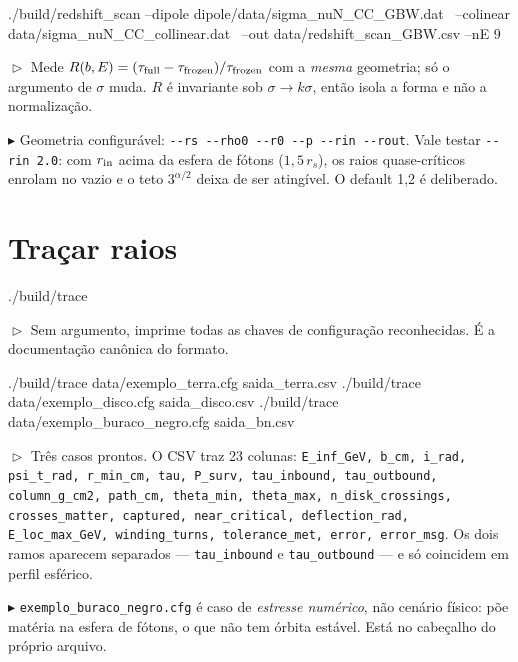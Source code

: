 \documentclass[10pt,a4paper]{article}
\newcommand{\teste}[1]{%
  \par\vspace{1pt}\noindent
  {\color{verde}\footnotesize$\vartriangleright$}\hspace{3pt}%
  {\color{cinza}\footnotesize #1}\par\vspace{7pt}}
\newcommand{\aviso}[1]{%
  \par\vspace{1pt}\noindent
  {\color{ferrugem}\footnotesize$\blacktriangleright$}\hspace{3pt}%
  {\color{cinza}\footnotesize #1}\par\vspace{7pt}}
\begin{document}
\begin{comando}
./build/redshift_scan --dipole dipole/data/sigma_nuN_CC_GBW.dat \
                      --colinear data/sigma_nuN_CC_collinear.dat \
                      --out data/redshift_scan_GBW.csv --nE 9
\end{comando}
\teste{Mede $R(b,E) = (\tau_{\rm full} - \tau_{\rm frozen})/\tau_{\rm
frozen}$ com a \emph{mesma} geometria; só o argumento de $\sigma$ muda.
$R$ é invariante sob $\sigma \to k\sigma$, então isola a forma e não a
normalização.}
\aviso{Geometria configurável: \texttt{-{}-rs -{}-rho0 -{}-r0 -{}-p
-{}-rin -{}-rout}. Vale testar \texttt{-{}-rin 2.0}: com $r_{\rm in}$
acima da esfera de fótons ($1{,}5\,r_s$), os raios quase-críticos
enrolam no vazio e o teto $3^{\alpha/2}$ deixa de ser atingível. O
default 1,2 é deliberado.}

\section{Traçar raios}

\begin{comando}
./build/trace
\end{comando}
\teste{Sem argumento, imprime todas as chaves de configuração
reconhecidas. É a documentação canônica do formato.}

\begin{comando}
./build/trace data/exemplo_terra.cfg saida_terra.csv
./build/trace data/exemplo_disco.cfg saida_disco.csv
./build/trace data/exemplo_buraco_negro.cfg saida_bn.csv
\end{comando}
\teste{Três casos prontos. O CSV traz 23 colunas:
\texttt{E\_inf\_GeV, b\_cm, i\_rad, psi\_t\_rad, r\_min\_cm, tau,
P\_surv, tau\_inbound, tau\_outbound, column\_g\_cm2, path\_cm,
theta\_min, theta\_max, n\_disk\_crossings, crosses\_matter, captured,
near\_critical, deflection\_rad, E\_loc\_max\_GeV, winding\_turns,
tolerance\_met, error, error\_msg}. Os dois ramos aparecem
separados --- \texttt{tau\_inbound} e \texttt{tau\_outbound} --- e só
coincidem em perfil esférico.}
\aviso{\texttt{exemplo\_buraco\_negro.cfg} é caso de \emph{estresse
numérico}, não cenário físico: põe matéria na esfera de fótons, o que
não tem órbita estável. Está no cabeçalho do próprio arquivo.}
\end{document}
